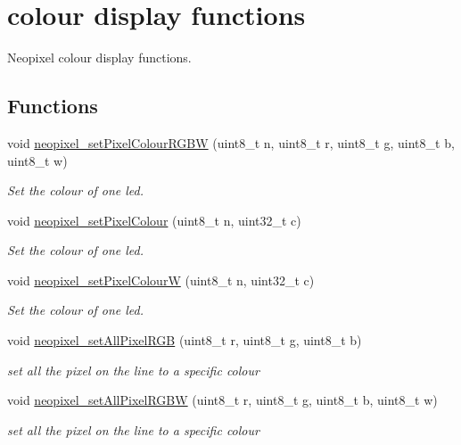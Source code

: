 \hypertarget{group___neo_pixel___display}{}\section{colour display functions}
\label{group___neo_pixel___display}


Neopixel colour display functions.  


\subsection*{Functions}
\begin{DoxyCompactItemize}
\item 
void \hyperlink{group___neo_pixel___display_ga58d5ceb79029ca8dc5dd8b27b65e4f09}{neopixel\+\_\+set\+Pixel\+Colour\+R\+G\+BW} (uint8\+\_\+t n, uint8\+\_\+t r, uint8\+\_\+t g, uint8\+\_\+t b, uint8\+\_\+t w)
\begin{DoxyCompactList}\small\item\em Set the colour of one led. \end{DoxyCompactList}\item 
void \hyperlink{group___neo_pixel___display_gaecbdecac1da356c5fba07058983d9066}{neopixel\+\_\+set\+Pixel\+Colour} (uint8\+\_\+t n, uint32\+\_\+t c)
\begin{DoxyCompactList}\small\item\em Set the colour of one led. \end{DoxyCompactList}\item 
void \hyperlink{group___neo_pixel___display_ga4daf6edfe83394f425ec51f64d92c49c}{neopixel\+\_\+set\+Pixel\+ColourW} (uint8\+\_\+t n, uint32\+\_\+t c)
\begin{DoxyCompactList}\small\item\em Set the colour of one led. \end{DoxyCompactList}\item 
void \hyperlink{group___neo_pixel___display_ga7a6c2dc149e86a788aede1d6aa5262d7}{neopixel\+\_\+set\+All\+Pixel\+R\+GB} (uint8\+\_\+t r, uint8\+\_\+t g, uint8\+\_\+t b)
\begin{DoxyCompactList}\small\item\em set all the pixel on the line to a specific colour \end{DoxyCompactList}\item 
void \hyperlink{group___neo_pixel___display_ga1ba017c1f338ef2c8e4a48acae35d87e}{neopixel\+\_\+set\+All\+Pixel\+R\+G\+BW} (uint8\+\_\+t r, uint8\+\_\+t g, uint8\+\_\+t b, uint8\+\_\+t w)
\begin{DoxyCompactList}\small\item\em set all the pixel on the line to a specific colour \end{DoxyCompactList}\end{DoxyCompactItemize}


